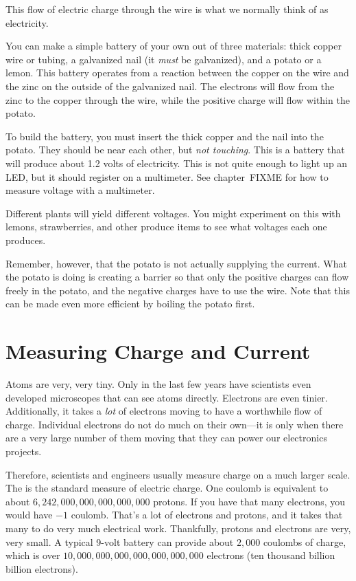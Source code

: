 This flow of electric charge through the wire is what we normally think of as electricity.

\begin{sidebar}
You can make a simple battery of your own out of three materials: thick copper wire or tubing, a galvanized nail (it \emph{must} be galvanized), and a potato or a lemon.
This battery operates from a reaction between the copper on the wire and the zinc on the outside of the galvanized nail.
The electrons will flow from the zinc to the copper through the wire, while the positive charge will flow within the potato.

To build the battery, you must insert the thick copper and the nail into the potato.  
They should be near each other, but \emph{not touching}.
This is a battery that will produce about 1.2 volts of electricity.
This is not quite enough to light up an LED, but it should register on a multimeter.  
See chapter~FIXME for how to measure voltage with a multimeter.

Different plants will yield different voltages.
You might experiment on this with lemons, strawberries, and other produce items to see what voltages each one produces.

Remember, however, that the potato is not actually supplying the current.
What the potato is doing is creating a barrier so that only the positive charges can flow freely in the potato, and the negative charges have to use the wire.
Note that this can be made even more efficient by boiling the potato first.
\end{sidebar}

\section{Measuring Charge and Current}

Atoms are very, very tiny.
Only in the last few years have scientists even developed microscopes that can see atoms directly.
Electrons are even tinier.
Additionally, it takes a \emph{lot} of electrons moving to have a worthwhile flow of charge.
Individual electrons do not do much on their own---it is only when there are a very large number of them moving that they can power our electronics projects.

Therefore, scientists and engineers usually measure charge on a much larger scale.
The  is the standard measure of electric charge.
One coulomb is equivalent to about $6,242,000,000,000,000,000$ protons.
If you have that many electrons, you would have $-1$ coulomb.
That's a lot of electrons and protons, and it takes that many to do very much electrical work.
Thankfully, protons and electrons are very, very small.
A typical 9-volt battery can provide about $2,000$ coulombs of charge, which is over $10,000,000,000,000,000,000,000$ electrons (ten thousand billion billion electrons).

